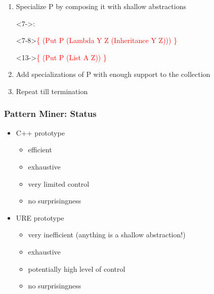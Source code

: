 \documentclass{beamer}
\begin{document}
\begin{frame}[fragile]
{\begin{enumerate}
  \item Specialize P by \alert{composing} it with shallow abstractions\begin{onlyenv}<7->:\end{onlyenv}
      \begin{onlyenv}<7-8>\textcolor{red}{\{ (Put P (Lambda Y Z
          (Inheritance Y Z))) \}}
      \end{onlyenv}\begin{onlyenv}<13->\textcolor{red}{\{ (Put P
          (List A Z)) \}}
      \end{onlyenv}

  \item Add specializations of P with \alert{enough support} to the
    collection
  \item Repeat till termination
  \end{enumerate}}
\end{frame}

\begin{frame}
  \frametitle{Pattern Miner: Status}

  \begin{itemize}
  \item C++ prototype
    \begin{itemize}
    \item efficient
    \item exhaustive
    \item very limited control
    \item no surprisingness
    \end{itemize}
  \item URE prototype
    \begin{itemize}
    \item very inefficient (anything is a shallow abstraction!)
    \item exhaustive
    \item potentially high level of control
    \item no surprisingness
    \end{itemize}
  \end{itemize}

\end{frame}
  
\end{document}
